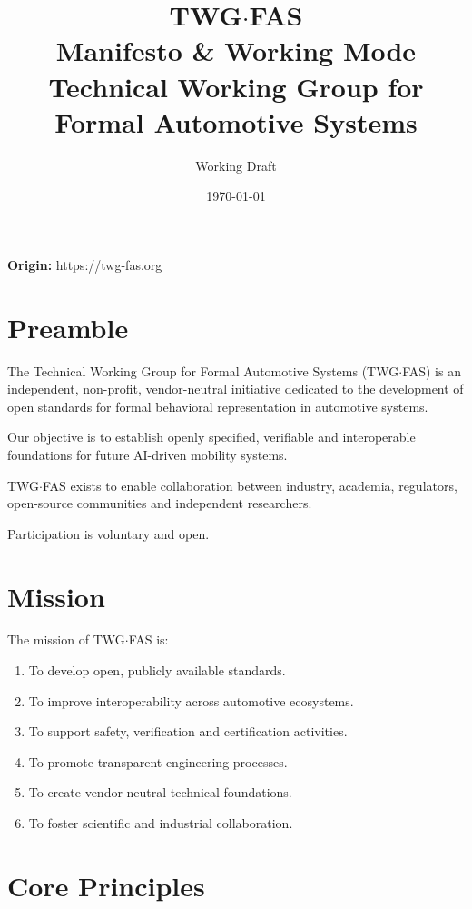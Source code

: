 \documentclass[11pt,a4paper]{article}
\title{
TWG$\cdot$FAS\\
Manifesto \& Working Mode\\
\vspace{0.3em}
\large Technical Working Group for Formal Automotive Systems
}
\author{Working Draft}
\date{\today}
\begin{document}
\maketitle
\begin{center}
\textbf{Origin:} https://twg-fas.org
\end{center}

\tableofcontents

\newpage

\section{Preamble}

The Technical Working Group for Formal Automotive Systems (TWG$\cdot$FAS)
is an independent, non-profit, vendor-neutral initiative dedicated to
the development of open standards for formal behavioral representation
in automotive systems.

Our objective is to establish openly specified, verifiable and
interoperable foundations for future AI-driven mobility systems.

TWG$\cdot$FAS exists to enable collaboration between industry,
academia, regulators, open-source communities and independent
researchers.

Participation is voluntary and open.

\section{Mission}

The mission of TWG$\cdot$FAS is:

\begin{enumerate}
\item To develop open, publicly available standards.
\item To improve interoperability across automotive ecosystems.
\item To support safety, verification and certification activities.
\item To promote transparent engineering processes.
\item To create vendor-neutral technical foundations.
\item To foster scientific and industrial collaboration.
\end{enumerate}

\section{Core Principles}
\end{document}
